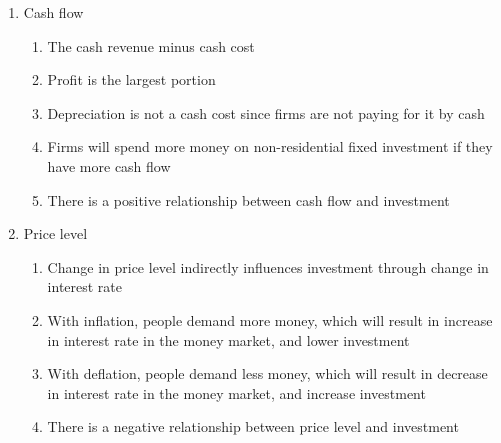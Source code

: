 \documentclass[12pt]{article}
\begin{document}
\begin{enumerate}
\begin{enumerate}
\begin{enumerate}
\begin{enumerate}
                \end{enumerate}

              \item Cash flow

                \begin{enumerate}

                  \item The cash revenue minus cash cost

                  \item Profit is the largest portion

                  \item Depreciation is not a cash cost since firms are not paying for it by cash


                  \item Firms will spend more money on non-residential fixed investment if they have more cash flow

                  \item There is a positive relationship between cash flow and investment

                \end{enumerate}

              \item Price level

                \begin{enumerate}

                  \item Change in price level indirectly influences investment through change in interest rate

                  \item With inflation, people demand more money, which will result in increase in interest rate in the money market, and lower investment

                  \item With deflation, people demand less money, which will result in decrease in interest rate in the money market, and increase investment

                  \item There is a negative relationship between price level and investment

                \end{enumerate}

            \end{enumerate}

        \end{enumerate}


\end{enumerate}
\end{document}
